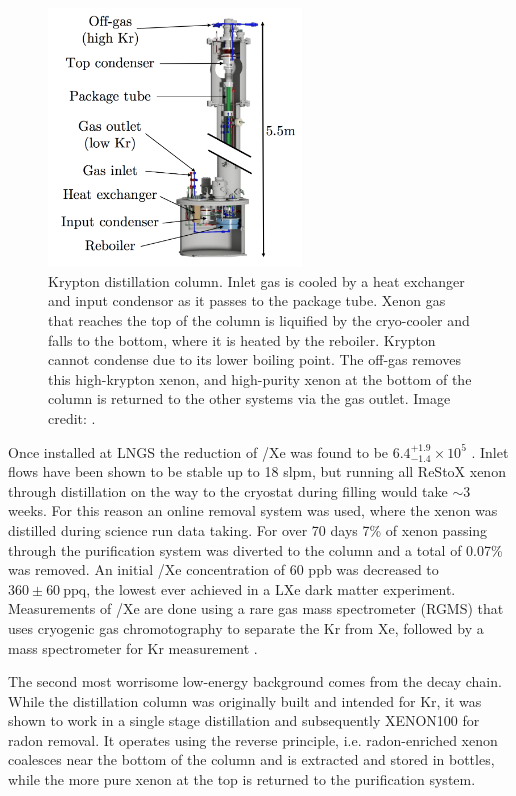 \begin{figure}
\centering
\includegraphics[width=0.6\textwidth]{KrColumn}
\caption{Krypton distillation column.  Inlet gas is cooled by a heat exchanger and input condensor as it passes to the package
tube.  Xenon gas that reaches the top of the
column is liquified by the cryo-cooler and falls to the bottom, where it is heated by the reboiler.  Krypton cannot condense due to its
lower boiling point.  The off-gas removes this high-krypton xenon, and high-purity xenon at the bottom of the column is returned to the
other systems via the gas outlet.  Image credit: .}
\label{fig:xeno1t_kr_dist_column}
\end{figure}

Once installed at LNGS the reduction of /Xe was found to be $6.4_{-1.4}^{+1.9} \times 10^{5}$
.  Inlet flows have been shown to be stable up to 18 slpm, but running all ReStoX xenon through distillation on the
way to the cryostat during filling would take ${\sim}3$ weeks.  For this reason an online removal system was used, where the xenon was
distilled during
science run data taking.  For over 70 days 7\% of xenon passing through the purification system was diverted to the column and a total
of 0.07\% was
removed.  An initial /Xe concentration of 60 ppb was decreased to $360 \pm 60\ \mathrm{ppq}$, the lowest ever achieved in a
LXe dark matter experiment.  Measurements of /Xe are done using a rare gas mass spectrometer (RGMS) that uses cryogenic gas
chromotography to separate the Kr from Xe, followed by a mass spectrometer for Kr measurement .

The second most worrisome low-energy background comes from the  decay chain.  While the distillation column was originally
built and intended for Kr,
it was shown to work in a single stage distillation  and subsequently XENON100
 for radon removal.  It operates using the reverse principle, i.e. radon-enriched xenon coalesces near the bottom
of the column and is extracted and stored in bottles, while the more pure xenon at the top is returned to the purification system.



